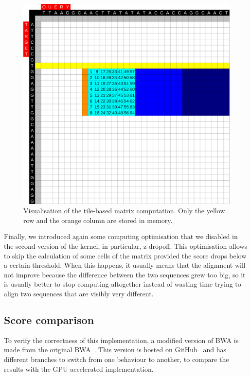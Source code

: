 \begin{figure}[h!]
	\centering
	\includegraphics[width=0.9\linewidth]{visualisation-aid-tile}
	\caption{Visualisation of the tile-based matrix computation. Only the yellow row and the orange column are stored in memory.}
	\label{fig:visualisation-aid-tile}
\end{figure}


Finally, we introduced again some computing optimisation that we disabled in the second version of the kernel, in particular, z-dropoff. This optimisation allows to skip the calculation of some cells of the matrix provided the score drops below a certain threshold. When this happens, it usually means that the alignment will not improve because the difference between the two sequences grew too big, so it is usually better to stop computing altogether instead of wasting time trying to align two sequences that are visibly very different.

\subsection{Score comparison}

To verify the correctness of this implementation, a modified version of BWA is made from the original BWA~\cite{lh3:bwa}. This version is hosted on GitHub~\cite{j-levy:bwa} and has different branches to switch from one behaviour to another, to compare the results with the GPU-accelerated implementation.

